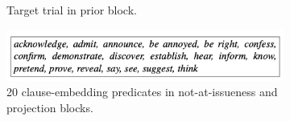 \documentclass[11pt,fleqn]{article}
\newcommand{\6}{\mbox{$[\hspace*{-.6mm}[$}}
\newcommand{\9}{\mbox{$]\hspace*{-.6mm}]$}}
\begin{document}
\begin{figure}[h!]
\centering

\begin{subfigure}[t]{0.5\textwidth}
        \centering
{}
\caption{Target trial in prior block.}\label{fig-exp1-prior}
\end{subfigure}
 \par\bigskip
\begin{subfigure}[t]{0.8\textwidth}
\par\bigskip
\centering
\includegraphics[width=10cm]{figures/predicates}
\caption{20 clause-embedding predicates in not-at-issueness and projection blocks.}\label{fig-exp1-predicates}
 \end{subfigure}
 \par\bigskip
\begin{subfigure}[t]{0.5\textwidth}
\par\bigskip
\centering

\end{subfigure}
\end{figure}
\end{document}
